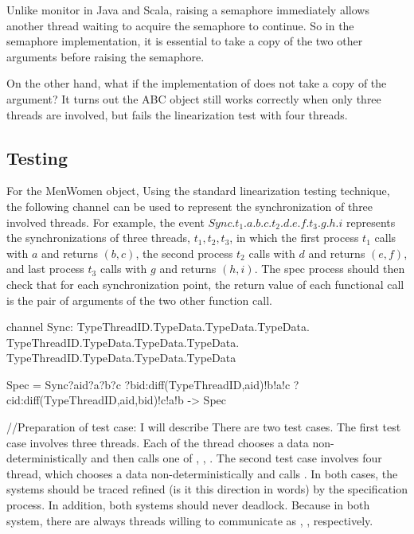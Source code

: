 \documentclass{article}
\begin{document}
Unlike monitor in Java and Scala, raising a semaphore immediately allows another thread waiting to acquire the semaphore to continue. So in the semaphore implementation, it is essential to take a copy of the two other arguments before raising the semaphore.

On the other hand, what if the implementation of  does not take a copy of the argument? It turns out the ABC object still works correctly when only three threads are involved, but fails the linearization test with four threads.

\subsection{Testing}
For the MenWomen object, 
Using the standard linearization testing technique, the following  channel can be used to represent the synchronization of three involved threads. For example, the event $Sync.t_1.a.b.c.t_2.d.e.f.t_3.g.h.i$ represents the synchronizations of three threads, $t_1,t_2,t_3$, in which the first process $t_1$ calls  with $a$ and returns $(b,c)$, the second process $t_2$ calls  with $d$ and returns $(e,f)$, and last process $t_3$ calls  with $g$ and returns $(h,i)$. The spec process should then check that for each synchronization point, the return value of each functional call is the pair of arguments of the two other function call.

\begin{cspinline}{}{}
channel Sync: TypeThreadID.TypeData.TypeData.TypeData.
              TypeThreadID.TypeData.TypeData.TypeData.
              TypeThreadID.TypeData.TypeData.TypeData

Spec = Sync?aid?a?b?c
           ?bid:diff(TypeThreadID,{aid})!b!a!c
           ?cid:diff(TypeThreadID,{aid,bid})!c!a!b 
    -> Spec
\end{cspinline}
//Preparation of test case: I will describe 
There are two test cases. The first test case involves three threads. Each of the thread chooses a data non-deterministically and then calls one of , , . The second test case involves four thread, which chooses a data non-deterministically and calls . In both cases, the systems should be traced refined (is it this direction in words) by the specification process. In addition, both systems should never deadlock. Because in both system, there are always threads willing to communicate as , ,  respectively.
\end{document}
